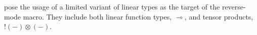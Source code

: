   \Vakar{} pose the usage of a limited variant of linear types as the target of the reverse-mode macro\cite{vkr2020reverse}.
  They include both linear function types, $\multimap$, and tensor products, $! (-) \otimes (-)$.



